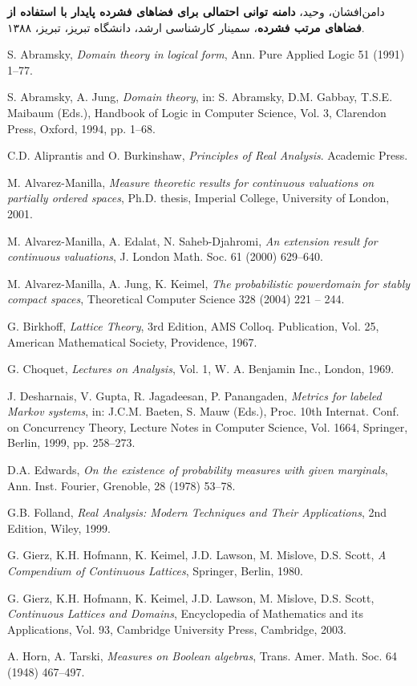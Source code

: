 \small
\begin{thebibliography}{9}
دامن‌افشان، وحید، \textbf{دامنه توانی احتمالی برای فضاهای فشرده پایدار با استفاده از فضاهای مرتب فشرده}، سمینار کارشناسی ارشد، دانشگاه تبریز، تبریز، ۱۳۸۸.
\begin{LTRitems}
\resetlatinfont

S. Abramsky, {\em Domain theory in logical form}, Ann. Pure Applied Logic 51 (1991) 1–77.

S. Abramsky, A. Jung, {\em Domain theory}, in: S. Abramsky, D.M. Gabbay, T.S.E. Maibaum (Eds.), Handbook of
Logic in Computer Science, Vol. 3, Clarendon Press, Oxford, 1994, pp. 1–68.

C.D. Aliprantis and O. Burkinshaw,   {\em Principles of Real Analysis}.  Academic Press.

M. Alvarez-Manilla, {\em Measure theoretic results for continuous valuations on partially ordered spaces}, Ph.D.
thesis, Imperial College, University of London, 2001.

M. Alvarez-Manilla, A. Edalat, N. Saheb-Djahromi, {\em An extension result for continuous valuations}, J. London
Math. Soc. 61 (2000) 629–640.

M. Alvarez-Manilla, A. Jung, K. Keimel, {\em The probabilistic powerdomain for stably compact
spaces}, Theoretical Computer Science 328 (2004) 221 – 244.

G. Birkhoff, {\em Lattice Theory}, 3rd Edition, AMS Colloq. Publication, Vol. 25, American Mathematical Society,
Providence, 1967.

G. Choquet, {\em Lectures on Analysis}, Vol. 1, W. A. Benjamin Inc., London, 1969.

J. Desharnais, V. Gupta, R. Jagadeesan, P. Panangaden, {\em Metrics for labeled Markov systems}, in: J.C.M.
Baeten, S. Mauw (Eds.), Proc. 10th Internat. Conf. on Concurrency Theory, Lecture Notes in Computer
Science, Vol. 1664, Springer, Berlin, 1999, pp. 258–273.

D.A. Edwards, {\em On the existence of probability measures with given marginals}, Ann. Inst. Fourier, Grenoble,
28 (1978) 53–78.

G.B. Folland, {\em Real Analysis: Modern Techniques and Their Applications}, 2nd Edition, Wiley, 1999.

G. Gierz, K.H. Hofmann, K. Keimel, J.D. Lawson, M. Mislove, D.S. Scott, {\em A Compendium of Continuous
Lattices}, Springer, Berlin, 1980.

G. Gierz, K.H. Hofmann, K. Keimel, J.D. Lawson, M. Mislove, D.S. Scott, {\em Continuous Lattices and
Domains}, Encyclopedia of Mathematics and its Applications, Vol. 93, Cambridge University Press,
Cambridge, 2003.

A. Horn, A. Tarski, {\em Measures on Boolean algebras}, Trans. Amer. Math. Soc. 64 (1948) 467–497.

\end{LTRitems}
\end{thebibliography}